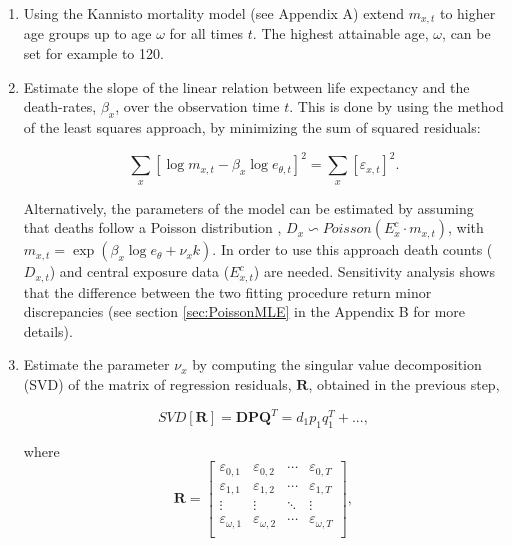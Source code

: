 \documentclass[risks,article,submit,moreauthors,pdftex]{Definitions/mdpi}
\begin{document}
\begin{enumerate}
\item Using the Kannisto mortality model (see Appendix A) extend $m_{x,t}$ to higher age groups up to age $\omega$ for all times $t$. The highest attainable age, $\omega$, can be set for example to 120.

\item Estimate the slope of the linear relation between life expectancy and the death-rates, $\beta_x$, over the observation time $t$. This is done by using the method of the least squares approach, by minimizing the sum of squared residuals:

\begin{equation}
\sum_{x} { \left[ \log{m_{x,t}} - \beta_x \log{e_{\theta,t}} \right]}^{2} = \sum_{x}{\left[\varepsilon_{x,t} \right]^2}.
\end{equation}

Alternatively, the parameters of the model can be estimated by assuming that deaths follow a Poisson distribution \citep{brouhns2002, brillinger1986}, $D_x \backsim Poisson(E_{x}^{c} \cdot m_{x,t})$, with $m_{x,t} = \exp(\beta_x\log{e_\theta} + \nu_xk)$. In order to use this approach death counts ($D_{x,t}$) and central exposure data ($E_{x,t}^{c}$) are needed. Sensitivity analysis shows that the difference between the two fitting procedure return minor discrepancies (see section \ref{sec:PoissonMLE} in the Appendix B for more details).

\item Estimate the parameter $\nu_{x}$ by computing the singular value decomposition (SVD) of the matrix of regression residuals, $\textbf{R}$, obtained in the previous step,

\begin{equation}
SVD\left[ \textbf{R} \right] ={\textbf{DPQ}}^{T}={d}_{1}{p}_{1}{q}_{1}^{T}+... ,
\end{equation}

where 
\begin{equation*}
\textbf{R} = \begin{bmatrix}
\varepsilon_{0,1}& \varepsilon_{0,2}& \cdots & \varepsilon_{0,T} \\
\varepsilon_{1,1}& \varepsilon_{1,2}& \cdots & \varepsilon_{1,T} \\
\vdots & \vdots & \ddots & \vdots\\
\varepsilon_{\omega,1}& \varepsilon_{\omega,2} & \cdots & \varepsilon_{\omega,T}\\
\end{bmatrix},
\end{equation*}


\end{enumerate}
\end{document}
